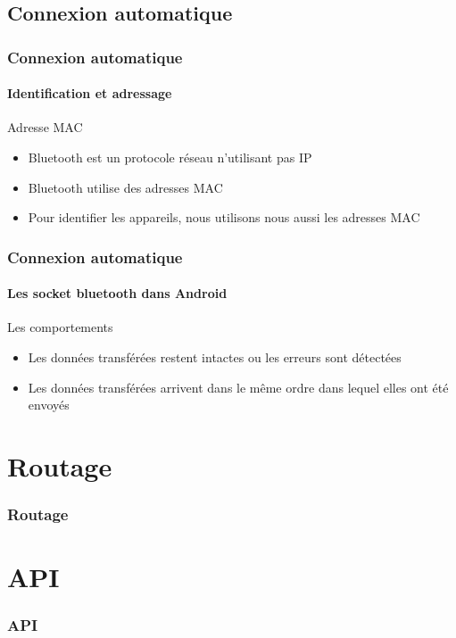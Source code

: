 \documentclass{beamer}
\begin{document}
    \subsection{Connexion automatique}
    \begin{frame}
      \frametitle{Connexion automatique}
      \framesubtitle{Identification et adressage}
      \begin{block}{Adresse MAC}
        \begin{itemize}
          \item Bluetooth est un protocole réseau n'utilisant pas IP
          \item Bluetooth utilise des adresses MAC
          \item Pour identifier les appareils, nous utilisons nous aussi les adresses MAC
        \end{itemize}
      \end{block}
    \end{frame}
    \begin{frame}
      \frametitle{Connexion automatique}
      \framesubtitle{Les socket bluetooth dans Android}
      \begin{block}{Les comportements}
        \begin{itemize}
          \item Les données transférées restent intactes ou les erreurs sont détectées
          \item Les données transférées arrivent dans le même ordre dans lequel elles ont été envoyés
        \end{itemize}
      \end{block}
    \end{frame}
  
  \section{Routage}
  \begin{frame}
    \frametitle{Routage}
    \framesubtitle{}
  
  \end{frame}
  
  \section{API}
  \begin{frame}
    \frametitle{API}
    \framesubtitle{}
  
  \end{frame}
  
  
\end{document}
